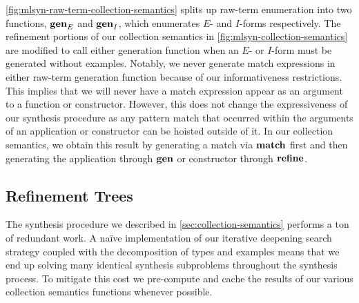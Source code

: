 

\autoref{fig:mlsyn-raw-term-collection-semantics} splits up raw-term enumeration into two functions, $\mathbf{gen}_E$ and $\mathbf{gen}_I$, which enumerates $E$- and $I$-forms respectively.
The refinement portions of our collection semantics in \autoref{fig:mlsyn-collection-semantics} are modified to call either generation function when an $E$- or $I$-form must be generated without examples.
Notably, we never generate match expressions in either raw-term generation function because of our informativeness restrictions.
This implies that we will never have a match expression appear as an argument to a function or constructor.
However, this does not change the expressiveness of our synthesis procedure as any pattern match that occurred within the arguments of an application or constructor can be hoisted outside of it.
In our collection semantics, we obtain this result by generating a match via $\mathbf{match}$ first and then generating the application through $\mathbf{gen}$ or constructor through $\mathbf{refine}$.

\subsection{Refinement Trees}
\label{subsec:refinement-trees}

The synthesis procedure we described in \autoref{sec:collection-semantics} performs a ton of redundant work.
A na\"{i}ve implementation of our iterative deepening search strategy coupled with the decomposition of types and examples means that we end up solving many identical synthesis subproblems throughout the synthesis process.
To mitigate this cost we pre-compute and cache the results of our various collection semantics functions whenever possible.

